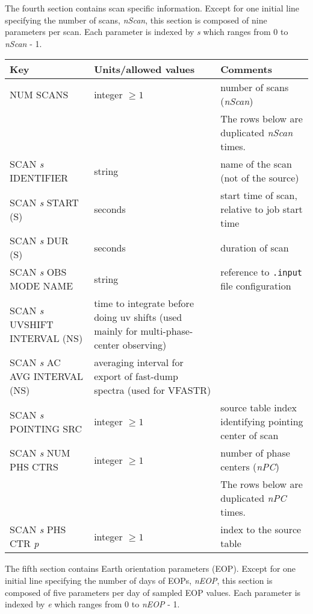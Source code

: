 The fourth section contains scan specific information.
Except for one initial line specifying the number of scans, {\em nScan}, this section is composed of nine parameters per scan.
Each parameter is indexed by {\em s} which ranges from 0 to {\em nScan} - 1.

\begin{center}
\begin{tabular}{l l l}
\hline
Key & Units/allowed values & Comments \\
\hline
NUM SCANS              & integer $\ge 1$ & number of scans ({\em nScan}) \\
&& The rows below are duplicated {\em nScan} times. \\
\hline
SCAN {\em s} IDENTIFIER & string & name of the scan (not of the source) \\
SCAN {\em s} START (S) & seconds  & start time of scan, relative to job start time \\
SCAN {\em s} DUR (S) & seconds  & duration of scan \\
SCAN {\em s} OBS MODE NAME & string & reference to {\tt .input} file configuration \\
SCAN {\em s} UVSHIFT INTERVAL (NS) & time to integrate before doing uv shifts (used mainly for multi-phase-center observing) \\
SCAN {\em s} AC AVG INTERVAL (NS) & averaging interval for export of fast-dump spectra (used for VFASTR) \\
SCAN {\em s} POINTING SRC & integer $\ge 1$ & source table index identifying pointing center of scan \\
SCAN {\em s} NUM PHS CTRS & integer $\ge 1$ & number of phase centers ({\em nPC}) \\
&& The rows below are duplicated {\em nPC} times. \\
SCAN {\em s} PHS CTR {\em p} & integer $\ge 1$ & index to the source table \\
\hline
\end{tabular}
\end{center}

The fifth section contains Earth orientation parameters (EOP).
Except for one initial line specifying the number of days of EOPs, {\em nEOP}, this section is composed of five parameters per day of sampled EOP values.
Each parameter is indexed by {\em e} which ranges from 0 to {\em nEOP} - 1.

